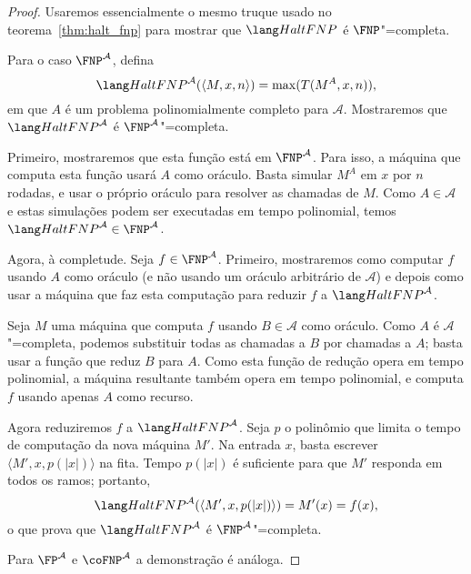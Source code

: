 \begin{proof}
    Usaremos essencialmente o mesmo truque usado no teorema~\ref{thm:halt_fnp}
    para mostrar que $\HaltFNP$ é $\FNP$"=completa.

    Para o caso $\FNP^\mathcal A$,
    defina
    \begin{equation*}
        \HaltFNP^\mathcal A(\langle M, x, n \rangle) =
            \max(T(M^A, x, n)),
    \end{equation*}
    em que $A$ é um problema polinomialmente completo para $\mathcal A$.
    Mostraremos que $\HaltFNP^\mathcal A$ é $\FNP^\mathcal A$"=completa.

    Primeiro, mostraremos que esta função está em $\FNP^\mathcal A$.
    Para isso, a máquina que computa esta função usará $A$ como oráculo.
    Basta simular $M^A$ em $x$ por $n$ rodadas,
    e usar o próprio oráculo para resolver as chamadas de $M$.
    Como $A \in \mathcal A$ e estas simulações podem ser executadas em tempo polinomial,
    temos $\HaltFNP^\mathcal A \in \FNP^\mathcal A$.

    Agora, à completude.
    Seja $f \in \FNP^\mathcal A$.
    Primeiro, mostraremos como computar $f$ usando $A$ como oráculo
    (e não usando um oráculo arbitrário de $\mathcal A$)
    e depois como usar a máquina que faz esta computação
    para reduzir $f$ a $\HaltFNP^\mathcal A$.

    Seja $M$ uma máquina que computa $f$ usando $B \in \mathcal A$ como oráculo.
    Como $A$ é $\mathcal A$"=completa,
    podemos substituir todas as chamadas a $B$
    por chamadas a $A$;
    basta usar a função que reduz $B$ para $A$.
    Como esta função de redução opera em tempo polinomial,
    a máquina resultante também opera em tempo polinomial,
    e computa $f$ usando apenas $A$ como recurso.

    Agora reduziremos $f$ a $\HaltFNP^\mathcal A$.
    Seja $p$ o polinômio que limita o tempo de computação da nova máquina $M'$.
    Na entrada $x$,
    basta escrever $\langle M', x, p(|x|) \rangle$ na fita.
    Tempo $p(|x|)$ é suficiente para que $M'$ responda em todos os ramos;
    portanto,
    \begin{equation*}
        \HaltFNP^\mathcal A(\langle M', x, p(|x|) \rangle) = M'(x) = f(x),
    \end{equation*}
    o que prova que $\HaltFNP^\mathcal A$ é $\FNP^\mathcal A$"=completa.

    Para $\FP^\mathcal A$ e $\coFNP^\mathcal A$ a demonstração é análoga.
\end{proof}
